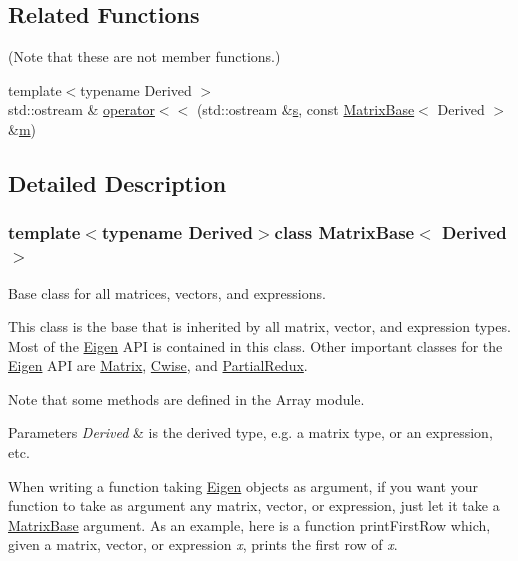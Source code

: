 \subsection*{Related Functions}
(Note that these are not member functions.) \begin{DoxyCompactItemize}
\item 
{\footnotesize template$<$typename Derived $>$ }\\std\-::ostream \& \hyperlink{class_matrix_base_a7cafa3b9b77704316e5c99df5f420cdf}{operator$<$$<$} (std\-::ostream \&\hyperlink{glext_8h_ad585a1393cfa368fa9dc3d8ebff640d5}{s}, const \hyperlink{class_matrix_base}{Matrix\-Base}$<$ Derived $>$ \&\hyperlink{glext_8h_af593500c283bf1a787a6f947f503a5c2}{m})
\end{DoxyCompactItemize}


\subsection{Detailed Description}
\subsubsection*{template$<$typename Derived$>$class Matrix\-Base$<$ Derived $>$}

Base class for all matrices, vectors, and expressions. 

This class is the base that is inherited by all matrix, vector, and expression types. Most of the \hyperlink{namespace_eigen}{Eigen} A\-P\-I is contained in this class. Other important classes for the \hyperlink{namespace_eigen}{Eigen} A\-P\-I are \hyperlink{class_matrix}{Matrix}, \hyperlink{class_cwise}{Cwise}, and \hyperlink{class_partial_redux}{Partial\-Redux}.

Note that some methods are defined in the Array module.


\begin{DoxyParams}{Parameters}
{\em Derived} & is the derived type, e.\-g. a matrix type, or an expression, etc.\\
\hline
\end{DoxyParams}
When writing a function taking \hyperlink{namespace_eigen}{Eigen} objects as argument, if you want your function to take as argument any matrix, vector, or expression, just let it take a \hyperlink{class_matrix_base}{Matrix\-Base} argument. As an example, here is a function print\-First\-Row which, given a matrix, vector, or expression {\itshape x}, prints the first row of {\itshape x}.


